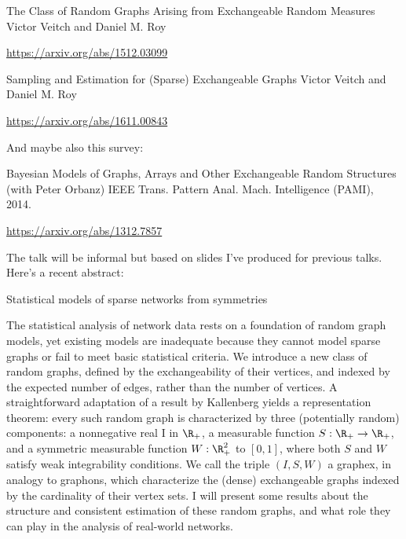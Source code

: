 \def\filepath{C:/Users/oldhe/Dropbox/Math/templates}






\pagestyle{fancy}
\chead{} 
\rhead{} 
\lfoot{} 
\cfoot{\thepage} 
\rfoot{} 
\renewcommand{\headrulewidth}{.3pt} 
\setlength\voffset{0in}
\setlength\textheight{648pt}





The Class of Random Graphs Arising from Exchangeable Random Measures 
Victor Veitch and Daniel M. Roy 

\url{https://arxiv.org/abs/1512.03099}

Sampling and Estimation for (Sparse) Exchangeable Graphs 
Victor Veitch and Daniel M. Roy

\url{https://arxiv.org/abs/1611.00843}

And maybe also this survey:

Bayesian Models of Graphs, Arrays and Other Exchangeable Random Structures 
(with Peter Orbanz) 
IEEE Trans. Pattern Anal. Mach. Intelligence (PAMI), 2014. 

\url{https://arxiv.org/abs/1312.7857}

The talk will be informal but based on slides I've produced for previous talks. Here's a recent abstract:

Statistical models of sparse networks from symmetries

The statistical analysis of network data rests on a foundation of random graph models, yet existing models are inadequate because they cannot model sparse graphs or fail to meet basic statistical criteria. We introduce a new class of random graphs, defined by the exchangeability of their vertices, and indexed by the expected number of edges, rather than the number of vertices. A straightforward adaptation of a result by Kallenberg yields a representation theorem: every such random graph is characterized by three (potentially random) components: a nonnegative real I in $\R_+$, a measurable function $S: \R_+ \to \R_+$, and a symmetric measurable function $W: \R_+^2 $ to $[0,1]$, where both $S$ and $W$ satisfy weak integrability conditions. We call the triple $(I,S,W)$ a graphex, in analogy to graphons, which characterize the (dense) exchangeable graphs indexed by the cardinality of their vertex sets. I will present some results about the structure and consistent estimation of these random graphs, and what role they can play in the analysis of real-world networks.

